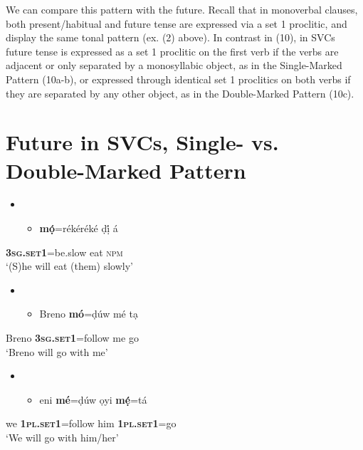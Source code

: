 \documentclass[output=paper]{langsci/langscibook}
\begin{document}
  We can compare this pattern with the future. Recall that in monoverbal clauses, both present/habitual and future tense are expressed via a set 1 proclitic, and display the same tonal pattern (ex. (2) above). In contrast in (10), in SVCs future tense is expressed as a set 1 proclitic on the first verb if the verbs are adjacent or only separated by a monosyllabic object, as in the Single-Marked Pattern (10a-b), or expressed through identical set 1 proclitics on both verbs if they are separated by any other object, as in the Double-Marked Pattern (10c). 

\chapter[Future in SVCs, Single{}- vs. Double{}-Marked Pattern]{Future in SVCs, Single- vs. Double-Marked Pattern}
\label{bkm:Ref453836224}\begin{itemize}
\item \setcounter{itemize}{0}
\begin{itemize}
\item \gll \textbf{mọ́}=rékéréké     ḍị́   á\\
\end{itemize}
\end{itemize}
     \textbf{\textsc{  3sg.set1}}=be.slow\textbf{ }  eat   \textsc{npm}\\
\glt ‘(S)he will eat (them) slowly’ 
\z

\begin{itemize}
\item \setcounter{itemize}{0}
\begin{itemize}
\item \gll Breno  \textbf{mó}=ḍúw       mé   tạ\\
\end{itemize}
\end{itemize}
       Breno   \textbf{\textsc{3sg.set1}}=follow    me  go\\
\glt ‘Breno will go with me’
\z

\begin{itemize}
\item \setcounter{itemize}{0}
\begin{itemize}
\item \gll eni   \textbf{mé}=ḍúw     ọyi    \textbf{mẹ́}=tá\\
\end{itemize}
\end{itemize}
       we   \textbf{\textsc{1pl.set1}}=follow  him    \textbf{\textsc{1pl.set1}}=go\\
\glt ‘We will go with him/her’
\z
\end{document}
